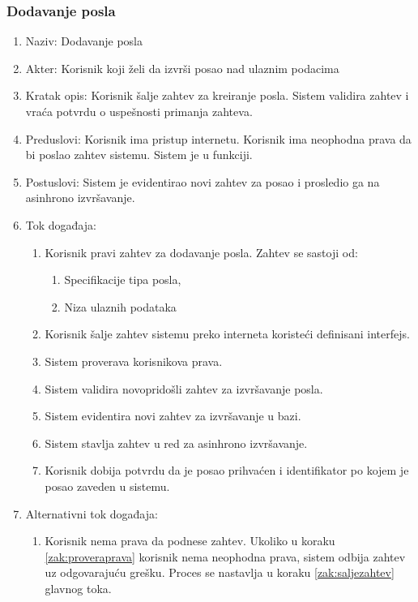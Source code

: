 \documentclass[12pt,oneside]{memoir}
\begin{document}
\subsubsection{Dodavanje posla}
\begin{enumerate}
\item Naziv: Dodavanje posla
\item Akter: Korisnik koji želi da izvrši posao nad ulaznim podacima
\item Kratak opis: Korisnik šalje zahtev za kreiranje posla. Sistem validira zahtev i vraća potvrdu o uspešnosti primanja zahteva.
\item Preduslovi: Korisnik ima pristup internetu. Korisnik ima neophodna prava da bi poslao zahtev sistemu. Sistem je u funkciji.
\item Postuslovi: Sistem je evidentirao novi zahtev za posao i prosledio ga na asinhrono izvršavanje.
\item Tok događaja:
	\begin{enumerate}
	\item \label{zak:pravizahtev}Korisnik pravi zahtev za dodavanje posla. Zahtev se sastoji od:
		\begin{enumerate}
		\item Specifikacije tipa posla,
		\item Niza ulaznih podataka
		\end{enumerate}
	\item \label{zak:saljezahtev} Korisnik šalje zahtev sistemu preko interneta koristeći definisani interfejs.
	\item \label{zak:proveraprava} Sistem proverava korisnikova prava.
	\item \label{zak:validacijazahteva} Sistem validira novopridošli zahtev za izvršavanje posla.
	\item Sistem evidentira novi zahtev za izvršavanje u bazi.
	\item \label{zak:asinhzakazivanje} Sistem stavlja zahtev u red za asinhrono izvršavanje.
	\item Korisnik dobija potvrdu da je posao prihvaćen i identifikator po kojem je posao zaveden u sistemu.
	\end{enumerate}
\item Alternativni tok događaja:
	\begin{enumerate}
	\item Korisnik nema prava da podnese zahtev. Ukoliko u koraku \ref{zak:proveraprava} korisnik nema neophodna prava, sistem odbija zahtev uz odgovarajuću grešku. Proces se nastavlja u koraku \ref{zak:saljezahtev} glavnog toka.

\end{enumerate}
\end{enumerate}
\end{document}
